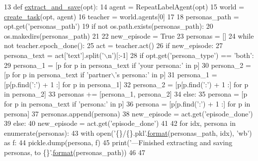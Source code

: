 \begin{DoxyCode}
13 \textcolor{keyword}{def }\hyperlink{namespacepersonachat__eval_1_1extract__and__save__personas_a7bae99c34a0b3f49cbce1328146926fd}{extract\_and\_save}(opt):
14     agent = RepeatLabelAgent(opt)
15     world = \hyperlink{namespaceparlai_1_1core_1_1worlds_a79969c7ba76d4b3c500f5bb776444dc6}{create\_task}(opt, agent)
16     teacher = world.agents[0]
17 
18     personas\_path = opt.get(\textcolor{stringliteral}{'personas\_path'})
19     \textcolor{keywordflow}{if} \textcolor{keywordflow}{not} os.path.exists(personas\_path):
20         os.makedirs(personas\_path)
21 
22     new\_episode = \textcolor{keyword}{True}
23     personas = []
24     \textcolor{keywordflow}{while} \textcolor{keywordflow}{not} teacher.epoch\_done():
25         act = teacher.act()
26         \textcolor{keywordflow}{if} new\_episode:
27             persona\_text = act[\textcolor{stringliteral}{'text'}].split(\textcolor{stringliteral}{'\(\backslash\)n'})[:-1]
28             \textcolor{keywordflow}{if} opt.get(\textcolor{stringliteral}{'persona\_type'}) == \textcolor{stringliteral}{'both'}:
29                 persona\_1 = [p \textcolor{keywordflow}{for} p \textcolor{keywordflow}{in} persona\_text \textcolor{keywordflow}{if} \textcolor{stringliteral}{'your persona:'} \textcolor{keywordflow}{in} p]
30                 persona\_2 = [p \textcolor{keywordflow}{for} p \textcolor{keywordflow}{in} persona\_text \textcolor{keywordflow}{if} \textcolor{stringliteral}{'partner\(\backslash\)'s persona:'} \textcolor{keywordflow}{in} p]
31                 persona\_1 = [p[p.find(\textcolor{stringliteral}{':'}) + 1 :] \textcolor{keywordflow}{for} p \textcolor{keywordflow}{in} persona\_1]
32                 persona\_2 = [p[p.find(\textcolor{stringliteral}{':'}) + 1 :] \textcolor{keywordflow}{for} p \textcolor{keywordflow}{in} persona\_2]
33                 personas += [persona\_1, persona\_2]
34             \textcolor{keywordflow}{else}:
35                 persona = [p \textcolor{keywordflow}{for} p \textcolor{keywordflow}{in} persona\_text \textcolor{keywordflow}{if} \textcolor{stringliteral}{'persona:'} \textcolor{keywordflow}{in} p]
36                 persona = [p[p.find(\textcolor{stringliteral}{':'}) + 1 :] \textcolor{keywordflow}{for} p \textcolor{keywordflow}{in} persona]
37                 personas.append(persona)
38             new\_episode = act.get(\textcolor{stringliteral}{'episode\_done'})
39         \textcolor{keywordflow}{else}:
40             new\_episode = act.get(\textcolor{stringliteral}{'episode\_done'})
41 
42     \textcolor{keywordflow}{for} idx, persona \textcolor{keywordflow}{in} enumerate(personas):
43         with open(\textcolor{stringliteral}{'\{\}/\{\}.pkl'}.\hyperlink{namespaceparlai_1_1chat__service_1_1services_1_1messenger_1_1shared__utils_a32e2e2022b824fbaf80c747160b52a76}{format}(personas\_path, idx), \textcolor{stringliteral}{'wb'}) \textcolor{keyword}{as} f:
44             pickle.dump(persona, f)
45     print(\textcolor{stringliteral}{'---Finished extracting and saving personas, to \{\}'}.\hyperlink{namespaceparlai_1_1chat__service_1_1services_1_1messenger_1_1shared__utils_a32e2e2022b824fbaf80c747160b52a76}{format}(personas\_path))
46 
47 
\end{DoxyCode}
